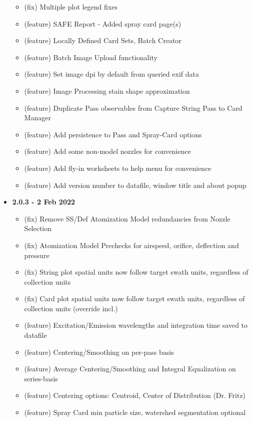\documentclass[10pt,letterpaper,titlepage]{article}
\begin{document}
\begin{itemize}
\begin{itemize}
            \item (fix) Multiple plot legend fixes
            \item (feature) SAFE Report - Added spray card page(s)
            \item (feature) Locally Defined Card Sets, Batch Creator
            \item (feature) Batch Image Upload functionality
            \item (feature) Set image dpi by default from queried exif data
            \item (feature) Image Processing stain shape approximation
            \item (feature) Duplicate Pass observables from Capture String Pass to Card Manager
            \item (feature) Add persistence to Pass and Spray-Card options
            \item (feature) Add some non-model nozzles for convenience
            \item (feature) Add fly-in worksheets to help menu for convenience
            \item (feature) Add version number to datafile, window title and about popup
        \end{itemize}
        \item \textbf{2.0.3 - 2 Feb 2022}
        \begin{itemize}
            \item (fix) Remove SS/Def Atomization Model redundancies from Nozzle Selection
            \item (fix) Atomization Model Prechecks for airspeed, orifice, deflection and pressure
            \item (fix) String plot spatial units now follow target swath units, regardless of collection units
            \item (fix) Card plot spatial units now follow target swath units, regardless of collection units (override incl.)
            \item (feature) Excitation/Emission wavelengths and integration time saved to datafile
            \item (feature) Centering/Smoothing on per-pass basis
            \item (feature) Average Centering/Smoothing and Integral Equalization on series-basis
            \item (feature) Centering options: Centroid, Center of Distribution (Dr. Fritz)
            \item (feature) Spray Card min particle size, watershed segmentation optional

\end{itemize}
\end{itemize}
\end{document}
